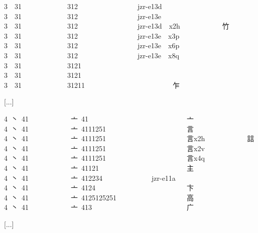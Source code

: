 3 {\cjk{}} 31            {\cjk{}} 312                 jzr-e13d  {} 
3 {\cjk{}} 31            {\cjk{}} 312                 jzr-e13e  {} 
3 {\cjk{}} 31            {\cjk{}} 312                 jzr-e13d  {}x2h            {\cjk{}竹} 
3 {\cjk{}} 31            {\cjk{}} 312                 jzr-e13e  {}x3p            {} 
3 {\cjk{}} 31            {\cjk{}} 312                 jzr-e13e  {}x6p            {} 
3 {\cjk{}} 31            {\cjk{}} 312                 jzr-e13e  {}x8q            {} 
3 {\cjk{}} 31            {\cjk{}} 3121                          {} 
3 {\cjk{}} 31            {\cjk{}} 3121                          {\cjk{}} 
3 {\cjk{}} 31            {\cjk{}} 31211                         {\cjk{}乍} 
 
[...] 
 
4 {\cjk{}丶} 41            {\cjk{}亠} 41                            {\cjk{}亠} 
4 {\cjk{}丶} 41            {\cjk{}亠} 4111251                       {\cjk{}言} 
4 {\cjk{}丶} 41            {\cjk{}亠} 4111251                       {\cjk{}言}x2h            {\cjk{}誩} 
4 {\cjk{}丶} 41            {\cjk{}亠} 4111251                       {\cjk{}言}x2v            {} 
4 {\cjk{}丶} 41            {\cjk{}亠} 4111251                       {\cjk{}言}x4q            {} 
4 {\cjk{}丶} 41            {\cjk{}亠} 41121                         {\cjk{}主} 
4 {\cjk{}丶} 41            {\cjk{}亠} 412234              jzr-e11a  {} 
4 {\cjk{}丶} 41            {\cjk{}亠} 4124                          {\cjk{}卞} 
4 {\cjk{}丶} 41            {\cjk{}亠} 4125125251                    {\cjk{}高} 
4 {\cjk{}丶} 41            {\cjk{}亠} 413                           {\cjk{}广} 
 
[...] 
 
